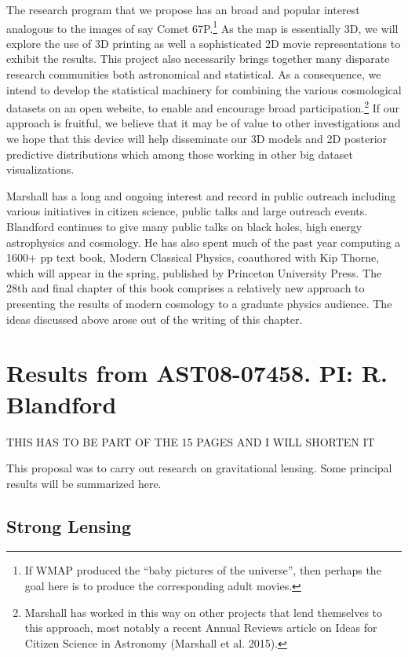 \documentclass[psfig,11pt]{article}
\begin{document}
{The research program that we propose has an broad and popular interest analogous to the images of say Comet 67P.\footnote{If WMAP produced the ``baby pictures of the universe'', then perhaps the goal here is to produce the corresponding adult movies.} As the map is essentially 3D, we will explore the use of 3D printing as well a sophisticated 2D movie representations to exhibit the results. This project also necessarily brings together many disparate research communities both astronomical and statistical. As a consequence, we intend to develop the statistical machinery for combining the various cosmological datasets on an open website, to enable and encourage broad participation.\footnote{Marshall has worked in this way on other projects that lend themselves to this approach, most notably a recent Annual Reviews article on Ideas for Citizen Science in Astronomy (Marshall et al. 2015).} If our approach is fruitful, we believe that it may be of value to other investigations and we hope that this device will help disseminate our 3D models and 2D posterior predictive distributions which among those working in other big dataset visualizations.

Marshall has a long and ongoing interest and record in public outreach including various initiatives in citizen science, public talks and large outreach events.  Blandford continues to give many public talks on black holes, high energy astrophysics and cosmology. He has also spent much of the past year computing a 1600+ pp text book, Modern Classical Physics, coauthored with Kip Thorne, which will appear in the spring, published by Princeton University Press. The 28th and final chapter of this book comprises a relatively new approach to presenting the results of modern cosmology to a graduate physics audience. The ideas discussed above arose out of the writing of this chapter.



\section{Results from AST08-07458. PI: R. Blandford}

THIS HAS TO BE PART OF THE 15 PAGES AND I WILL SHORTEN IT

This proposal was to carry out research on gravitational lensing. Some principal results will be summarized here.
\subsection{Strong Lensing}
}
\end{document}
